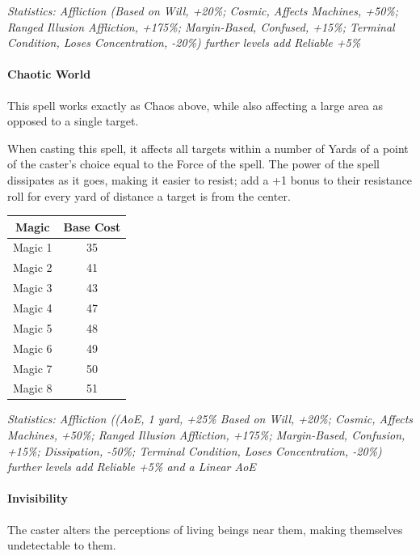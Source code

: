 \begin{multicols}{3}
	\textcolor{OliveGreen}{\textit{Statistics: Affliction (Based on Will, +20\%; Cosmic, Affects Machines, +50\%; Ranged Illusion Affliction, +175\%; Margin-Based, Confused, +15\%; Terminal Condition, Loses Concentration, -20\%)  further levels add Reliable +5\%}}
	
	\paragraph{Chaotic World}
	
	This spell works exactly as Chaos above, while also affecting a large area as opposed to a single target.
	
	When casting this spell, it affects all targets within a number of Yards of a point of the caster's choice equal to the Force of the spell. The power of the spell dissipates as it goes, making it easier to resist; add a +1 bonus to their resistance roll for every yard of distance a target is from the center.
	
	\begin{center}
		\begin{tabular}{|c|c|}
			\hline
			Magic & Base Cost \\
			\hline
			\hline
			Magic 1 & 35 \\
			Magic 2 & 41 \\
			Magic 3 & 43 \\
			Magic 4 & 47 \\
			Magic 5 & 48 \\
			Magic 6 & 49 \\
			Magic 7 & 50 \\
			Magic 8 & 51 \\
			\hline
		\end{tabular}
	\end{center}
	
	\textcolor{OliveGreen}{\textit{Statistics: Affliction ((AoE, 1 yard, +25\% Based on Will, +20\%; Cosmic, Affects Machines, +50\%; Ranged Illusion Affliction, +175\%; Margin-Based, Confusion, +15\%; Dissipation, -50\%; Terminal Condition, Loses Concentration, -20\%)  further levels add Reliable +5\% and a Linear AoE}}
		
	\paragraph{Invisibility}
	
	The caster alters the perceptions of living beings near them, making themselves undetectable to them.
	

\end{multicols}
